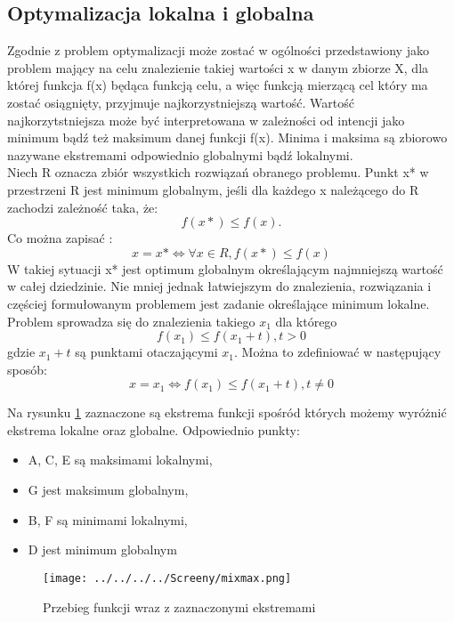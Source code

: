 \subsection{Optymalizacja lokalna i globalna}

Zgodnie z \cite{michal} problem optymalizacji może zostać w ogólności przedstawiony jako problem mający na celu znalezienie takiej wartości x w danym zbiorze X, dla której funkcja f(x) będąca funkcją celu, a więc funkcją mierzącą cel który ma zostać osiągnięty, przyjmuje najkorzystniejszą wartość. Wartość najkorzytstniejsza może być interpretowana w zależności od intencji jako minimum bądź też maksimum danej funkcji f(x). Minima i maksima są zbiorowo nazywane ekstremami odpowiednio globalnymi bądź lokalnymi.\\

Niech R oznacza zbiór wszystkich rozwiązań obranego problemu. Punkt x* w przestrzeni R jest minimum globalnym, jeśli dla każdego x należącego do R zachodzi zależność taka, że:
$$
 f(x*) \le f(x).
$$
Co można zapisać :
$$
x = x*   \Leftrightarrow   \forall x \in R,    f(x*)\le f(x)
$$
W takiej sytuacji x* jest optimum globalnym określającym najmniejszą wartość w całej dziedzinie. Nie mniej jednak łatwiejszym do znalezienia, rozwiązania i częściej formułowanym problemem jest zadanie określające minimum lokalne. Problem sprowadza się do znalezienia takiego $x_{1} $ dla którego 
$$
f(x_{1}) \le f(x_{1} + t), t >0
$$
gdzie $x_{1} + t $ są punktami otaczającymi $x_{1}$.
Można to zdefiniować w następujący sposób:
$$
x = x_{1} \Leftrightarrow f(x_{1}) \le f(x_{1} + t), t \ne 0
$$

Na rysunku \ref{minmax} zaznaczone są ekstrema funkcji spośród których możemy wyróżnić ekstrema lokalne oraz globalne. Odpowiednio punkty:\\

\begin{itemize}
\item A, C, E są maksimami lokalnymi,
\item G jest maksimum globalnym,
\item B, F są minimami lokalnymi,
\item D jest minimum globalnym
\end{itemize}

\begin{figure}[h!]
\begin{center}
		\texttt{[image: ../../../../Screeny/mixmax.png]}
		\caption{Przebieg funkcji wraz z zaznaczonymi ekstremami}
		\label{minmax}		
\end{center}	
\end{figure}

